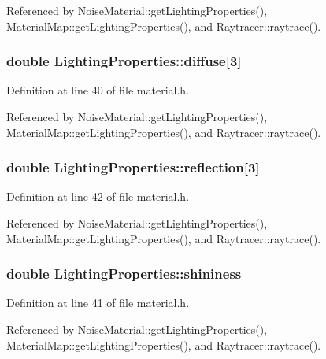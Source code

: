 Referenced by Noise\+Material\+::get\+Lighting\+Properties(), Material\+Map\+::get\+Lighting\+Properties(), and Raytracer\+::raytrace().

\subsubsection[{diffuse}]{\setlength{\rightskip}{0pt plus 5cm}double Lighting\+Properties\+::diffuse[3]}\label{class_lighting_properties_a2929421503c5030cb19a5f8eefabbfdd}


Definition at line 40 of file material.\+h.



Referenced by Noise\+Material\+::get\+Lighting\+Properties(), Material\+Map\+::get\+Lighting\+Properties(), and Raytracer\+::raytrace().

\subsubsection[{reflection}]{\setlength{\rightskip}{0pt plus 5cm}double Lighting\+Properties\+::reflection[3]}\label{class_lighting_properties_a39dea5f8dd780e1ab17261ab3503795d}


Definition at line 42 of file material.\+h.



Referenced by Noise\+Material\+::get\+Lighting\+Properties(), Material\+Map\+::get\+Lighting\+Properties(), and Raytracer\+::raytrace().

\subsubsection[{shininess}]{\setlength{\rightskip}{0pt plus 5cm}double Lighting\+Properties\+::shininess}\label{class_lighting_properties_a213c42ef1df28e24a0b737ea6a5907f4}


Definition at line 41 of file material.\+h.



Referenced by Noise\+Material\+::get\+Lighting\+Properties(), Material\+Map\+::get\+Lighting\+Properties(), and Raytracer\+::raytrace().

